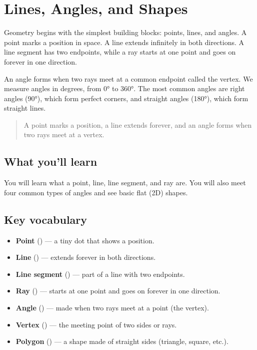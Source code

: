 \section{Lines, Angles, and Shapes}

Geometry begins with the simplest building blocks: points, lines, and angles. A
point marks a position in space. A line extends infinitely in both directions. A
line segment has two endpoints, while a ray starts at one point and goes on
forever in one direction.

An angle forms when two rays meet at a common endpoint called the vertex. We
measure angles in degrees, from 0° to 360°. The most common angles are right
angles (90°), which form perfect corners, and straight angles (180°), which form
straight lines.

\blockquote{A point marks a position, a line extends forever, and an angle forms
when two rays meet at a vertex.}

\subsection{What you'll learn}

You will learn what a point, line, line segment, and ray are. You will also meet
four common types of angles and see basic flat (2D) shapes.

\subsection{Key vocabulary}

\begin{itemize}
  \item \textbf{Point} () --- a tiny dot that shows a position.
  \item \textbf{Line} () --- extends forever in both directions.
  \item \textbf{Line segment} () --- part of a line with two endpoints.
  \item \textbf{Ray} () --- starts at one point and goes on forever in one direction.
  \item \textbf{Angle} () --- made when two rays meet at a point (the vertex).
  \item \textbf{Vertex} () --- the meeting point of two sides or rays.
  \item \textbf{Polygon} () --- a shape made of straight sides (triangle, square, etc.).
\end{itemize}

